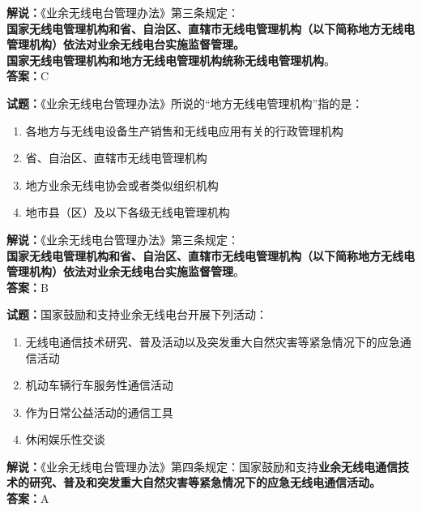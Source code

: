 \documentclass{ctexbook}
\begin{document}
\noindent\textbf{解说：}《业余无线电台管理办法》第三条规定：\\\textbf{国家无线电管理机构和省、自治区、直辖市无线电管理机构（以下简称地方无线电管理机构）依法对业余无线电台实施监督管理。\\
  国家无线电管理机构和地方无线电管理机构统称无线电管理机构}。\\\noindent\textbf{答案：}C

\vspace{\baselineskip}

\noindent\textbf{试题：}《业余无线电台管理办法》所说的“地方无线电管理机构”指的是：

\begin{enumerate}[leftmargin=3em]
  \item 各地方与无线电设备生产销售和无线电应用有关的行政管理机构
  \item 省、自治区、直辖市无线电管理机构
  \item 地方业余无线电协会或者类似组织机构
  \item 地市县（区）及以下各级无线电管理机构
\end{enumerate}

\noindent\textbf{解说：}《业余无线电台管理办法》第三条规定：\\\textbf{国家无线电管理机构和省、自治区、直辖市无线电管理机构（以下简称地方无线电管理机构）依法对业余无线电台实施监督管理}。\\\noindent\textbf{答案：}B

\vspace{\baselineskip}

\noindent\textbf{试题：}国家鼓励和支持业余无线电台开展下列活动：

\begin{enumerate}[leftmargin=3em]
  \item 无线电通信技术研究、普及活动以及突发重大自然灾害等紧急情况下的应急通信活动
  \item 机动车辆行车服务性通信活动
  \item 作为日常公益活动的通信工具
  \item 休闲娱乐性交谈
\end{enumerate}

\noindent\textbf{解说：}《业余无线电台管理办法》第四条规定：国家鼓励和支持\textbf{业余无线电通信技术的研究、普及和突发重大自然灾害等紧急情况下的应急无线电通信活动。}\\\noindent\textbf{答案：}A

\vspace{\baselineskip}
\end{document}
